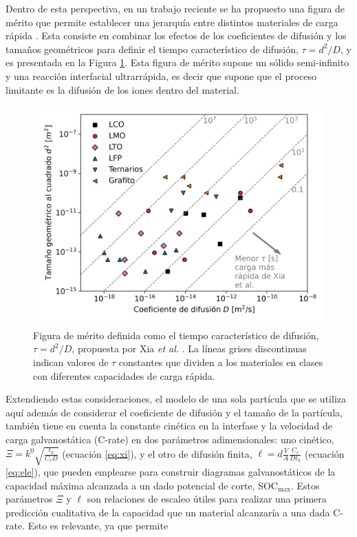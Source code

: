 Dentro de esta perspectiva, en un trabajo reciente se ha propuesto una figura de mérito que permite establecer 
una jerarquía entre distintos materiales de carga rápida \cite{xia2022}. 
Esta consiste en combinar los efectos de los coeficientes de difusión y los 
tamaños geométricos para definir el tiempo característico de difusión, 
$\tau = d^2 / D$, y es presentada en la Figura \ref{fig:xiafom}. Esta figura de 
mérito supone un sólido semi-infinito y una reacción interfacial ultrarrápida, 
es decir que supone que el proceso limitante es la difusión de los iones dentro 
del material.
\begin{figure}[h!]
    \centering
    \includegraphics[width=.7\textwidth]{FastCharging/un/introduccion/xiafom.png}
    \caption{Figura de mérito definida como el tiempo característico de difusión, 
    $\tau = d^2/D$, propuesta por Xia \textit{et al.} \cite{xia2022}. La líneas
    grises discontinuas indican valores de $\tau$ constantes que dividen a los 
    materiales en clases con diferentes capacidades de carga rápida.}
    \label{fig:xiafom}
\end{figure}
Extendiendo estas consideraciones, el modelo de una sola partícula que se utiliza 
aquí además de considerar el coeficiente de difusión y el tamaño de la partícula,
también tiene en cuenta la constante cinética en la interfase y la velocidad 
de carga galvanostática (C-rate) en dos parámetros adimensionales: 
uno cinético, $\Xi = k^0 \sqrt{\frac{t_h}{C_r D}}$ (ecuación \ref{eq:xi}), 
y el otro de difusión finita, $\ell = d \frac{V}{A} \frac{C_r}{D t_h}$
(ecuación \ref{eq:ele}), que pueden emplearse para construir
diagramas galvanostáticos de la capacidad máxima alcanzada a un dado potencial
de corte, SOC$_{\max}$. Estos parámetros $\Xi$ y $\ell$ son relaciones de escaleo útiles
para realizar una primera predicción cualitativa de la capacidad que un 
material alcanzaría a una dada C-rate. Esto es relevante, ya que permite
